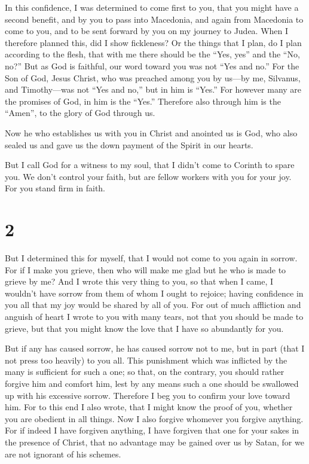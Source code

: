  In this confidence, I was determined to come first to you,
that you might have a second benefit,  and by you to pass
into Macedonia, and again from Macedonia to come to you, and to be sent
forward by you on my journey to Judea.  When I therefore
planned this, did I show fickleness? Or the things that I plan, do I
plan according to the flesh, that with me there should be the ``Yes,
yes'' and the ``No, no?''  But as God is faithful, our word
toward you was not ``Yes and no.''  For the Son of God,
Jesus Christ, who was preached among you by us---by me, Silvanus, and
Timothy---was not ``Yes and no,'' but in him is ``Yes.'' 
For however many are the promises of God, in him is the ``Yes.''
Therefore also through him is the ``Amen'', to the glory of God through
us.

 Now he who establishes us with you in Christ and anointed
us is God,  who also sealed us and gave us the down payment
of the Spirit in our hearts.

 But I call God for a witness to my soul, that I didn't
come to Corinth to spare you.  We don't control your faith,
but are fellow workers with you for your joy. For you stand firm in
faith.

\hypertarget{section-1}{%
\section{2}\label{section-1}}

 But I determined this for myself, that I would not come to
you again in sorrow.  For if I make you grieve, then who
will make me glad but he who is made to grieve by me?  And I
wrote this very thing to you, so that when I came, I wouldn't have
sorrow from them of whom I ought to rejoice; having confidence in you
all that my joy would be shared by all of you.  For out of
much affliction and anguish of heart I wrote to you with many tears, not
that you should be made to grieve, but that you might know the love that
I have so abundantly for you.

 But if any has caused sorrow, he has caused sorrow not to
me, but in part (that I not press too heavily) to you all. 
This punishment which was inflicted by the many is sufficient for such a
one;  so that, on the contrary, you should rather forgive
him and comfort him, lest by any means such a one should be swallowed up
with his excessive sorrow.  Therefore I beg you to confirm
your love toward him.  For to this end I also wrote, that I
might know the proof of you, whether you are obedient in all things.
 Now I also forgive whomever you forgive anything. For if
indeed I have forgiven anything, I have forgiven that one for your sakes
in the presence of Christ,  that no advantage may be gained
over us by Satan, for we are not ignorant of his schemes.

